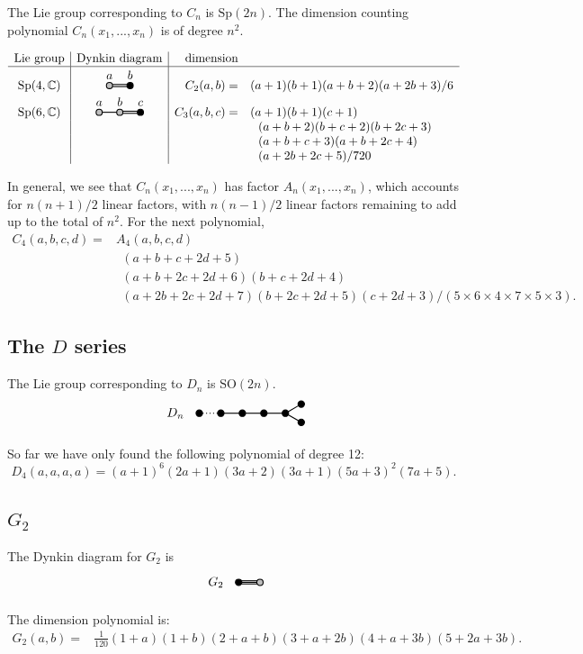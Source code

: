 \documentclass[11pt,oneside]{article}
\newcommand{\Complex}{\mathbb{C}}
\newcommand{\SO}{\mathrm{SO}}
\newcommand{\Sp}{\mathrm{Sp}}
\begin{document}
The Lie group corresponding to $C_n$ is $\Sp(2n).$
The dimension counting polynomial $C_n(x_1,...,x_n)$ is
of degree $n^2.$

$$
\begin{array}{c|c|rl}
\text{Lie group} & \text{Dynkin diagram} & \text{dimension} & \\
\hline
\Sp(4,\Complex) & \DynkinCab  & C_2(a,b) =& (a+1)(b+1)(a+b+2)(a+2b+3)/6 \\
\Sp(6,\Complex) & \DynkinCabc & C_3(a,b,c) =& (a+1)(b+1)(c+1) \\
                             & & &\ \ (a+b+2)(b+c+2)(b+2c+3)\\
                             & & &\ \ (a+b+c+3)(a+b+2c+4)\\
            & & &\ \ (a+2b+2c+5)/720 \\
\end{array}
$$

In general, we see that $C_n(x_1,...,x_n)$ has factor $A_n(x_1,...,x_n)$,
which accounts for $n(n+1)/2$ linear factors, with $n(n-1)/2$ linear
factors remaining to add up to the total of $n^2$.
For the next polynomial,
\begin{align*}
C_4(a, b, c, d) =& A_4(a, b, c, d) \\
    &\ \  (a+b+c+2d+5) \\
    &\ \  (a+b+2c+2d+6)(b+c+2d+4) \\
    &\ \  (a+2b+2c+2d+7)(b+2c+2d+5)(c+2d+3)/(5\times 6\times 4\times 7\times 5\times 3).
\end{align*}

\subsection{The $D$ series}

The Lie group corresponding to $D_n$ is $\SO(2n).$
$$
\DynkinDn
$$

So far we have only found the following polynomial of degree 12:
$$
D_4(a, a, a, a) = (a+1)^6(2a+1)(3a+2)(3a+1)(5a+3)^2(7a+5).
$$

\subsection{$G_2$}

The Dynkin diagram for $G_2$ is
$$
\DynkinGtwo
$$

The dimension polynomial is:
\begin{align*}
G_2(a, b) =& \frac{1}{120} (1+a)(1+b)(2+a+b)(3+a+2b)(4+a+3b)(5+2a+3b).
\end{align*}
\end{document}
